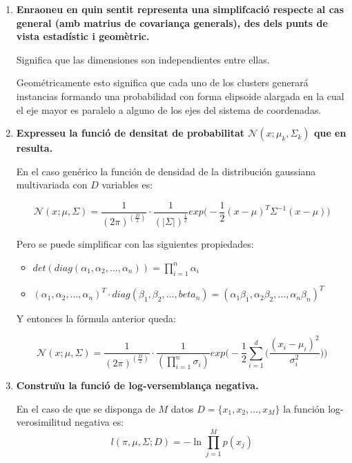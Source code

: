 \documentclass[a5paper]{article}
\begin{document}
\begin{enumerate}
\item \textbf{Enraoneu en quin sentit representa una simplifcació respecte al cas general (amb matrius de
covariança generals), des dels punts de vista estadístic i geomètric.
}

Significa que las dimensiones son independientes entre ellas.

Geométricamente esto significa que cada uno de los clusters generará instancias formando una probabilidad con forma elipsoide alargada en la cual el eje mayor es paralelo a alguno de los ejes del sistema de coordenadas.
\item \textbf{Expresseu la funció de densitat de probabilitat $\mathcal{N}(x; \mu_k, \Sigma_k)$ que en resulta.
}

En el caso genérico la función de densidad de la distribución gaussiana multivariada con $D$ variables es:

\begin{equation*}
\mathcal{N}(x;\mu,\Sigma) = \frac{1}{(2\pi)^{(\frac{D}{2})}} \cdot \frac{1}{(|\Sigma|)^{\frac{1}{2}}} exp\Bigg( -\frac{1}{2} (x - \mu)^T\Sigma^{-1}(x - \mu) \Bigg)
\end{equation*}

Pero se puede simplificar con las siguientes propiedades:
\begin{itemize}
\item $det( diag(\alpha_1,\alpha_2, \dots, \alpha_n) ) = \prod_{i = 1}^n \alpha_i$
\item $(\alpha_1,\alpha_2, \dots, \alpha_n)^T \cdot diag(\beta_1,\beta_2, \dots, beta_n) = (\alpha_1\beta_1, \alpha_2\beta_2, \dots, \alpha_n\beta_n)^T$
\end{itemize}

Y entonces la fórmula anterior queda:

\begin{equation*}
\mathcal{N}(x;\mu,\Sigma) = \frac{1}{(2\pi)^{(\frac{D}{2})}} \cdot \frac{1}{(\prod_{i = 1}^n \sigma_i)} exp\Bigg( -\frac{1}{2} \sum_{i = 1}^{d} \Big( \frac{(x_i - \mu_i)^2}{\sigma_i^2} \Big) \Bigg)
\end{equation*}
\item \textbf{Construïu la funció de log-versemblança negativa.
}

En el caso de que se disponga de $M$ datos $D = \{x_1, x_2, \dots, x_M\}$ la función log-verosimilitud negativa es:
\begin{equation*}
l(\pi, \mu, \Sigma; D) = -\ln \prod_{j = 1}^{M} p(x_j) 
\end{equation*}


\end{enumerate}
\end{document}
